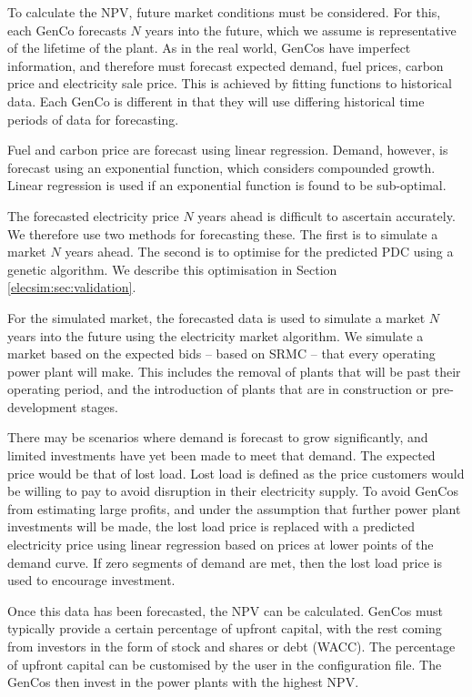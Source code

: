 To calculate the NPV, future market conditions must be considered. For this, each GenCo forecasts $N$ years into the future, which we assume is representative of the lifetime of the plant. As in the real world, GenCos have imperfect information, and therefore must forecast expected demand, fuel prices, carbon price and electricity sale price. This is achieved by fitting functions to historical data. Each GenCo is different in that they will use differing historical time periods of data for forecasting.

Fuel and carbon price are forecast using linear regression. Demand, however, is forecast using an exponential function, which considers compounded growth. Linear regression is used if an exponential function is found to be sub-optimal.

The forecasted electricity price $N$ years ahead is difficult to ascertain accurately. We therefore use two methods for forecasting these. The first is to simulate a market $N$ years ahead. The second is to optimise for the predicted PDC using a genetic algorithm. We describe this optimisation in Section \ref{elecsim:sec:validation}.

For the simulated market, the forecasted data is used to simulate a market $N$ years into the future using the electricity market algorithm. We simulate a market based on the expected bids -- based on SRMC -- that every operating power plant will make. This includes the removal of plants that will be past their operating period, and the introduction of plants that are in construction or pre-development stages. 

There may be scenarios where demand is forecast to grow significantly, and limited investments have yet been made to meet that demand. The expected price would be that of lost load. Lost load is defined as the price customers would be willing to pay to avoid disruption in their electricity supply. To avoid GenCos from estimating large profits, and under the assumption that further power plant investments will be made, the lost load price is replaced with a predicted electricity price using linear regression based on prices at lower points of the demand curve. If zero segments of demand are met, then the lost load price is used to encourage investment. 

Once this data has been forecasted, the NPV can be calculated. GenCos must typically provide a certain percentage of upfront capital, with the rest coming from investors in the form of stock and shares or debt (WACC). The percentage of upfront capital can be customised by the user in the configuration file. The GenCos then invest in the power plants with the highest NPV. 


